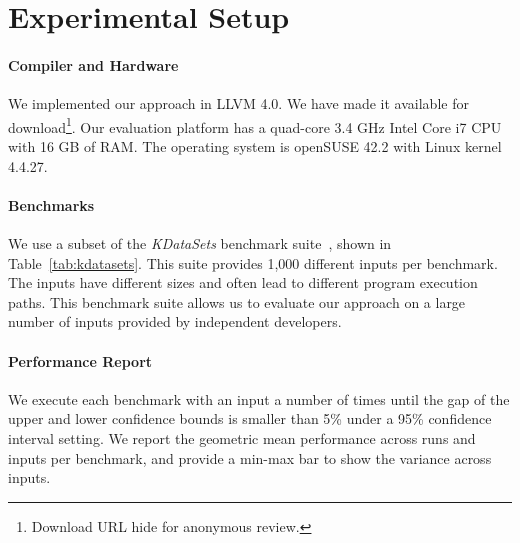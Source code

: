 \section{Experimental Setup}\label{sec:setup}

\paragraph{Compiler and Hardware} We implemented our approach in LLVM 4.0.
We have made it available for download\footnote{Download URL hide for anonymous review.}.
Our evaluation platform has a quad-core 3.4 GHz Intel Core i7 CPU with 16 GB of RAM.
The operating system is openSUSE 42.2 with Linux kernel 4.4.27.


\paragraph{Benchmarks}
We use a subset of the \textit{KDataSets} benchmark suite~\cite{chen10,chen12a},
shown in Table~\ref{tab:kdatasets}.
This suite provides 1,000 different inputs per benchmark.
The inputs have different sizes and often lead to different program execution paths.
This benchmark suite allows us to evaluate our approach on a large number of inputs provided by independent
developers.





\paragraph{Performance Report}
We execute each benchmark with an input a number of times until the gap of the upper and lower confidence bounds is smaller than 5\% under
a 95\% confidence interval setting. We report the geometric mean performance across runs and inputs per benchmark, and provide a min-max
bar to show the variance across inputs.


